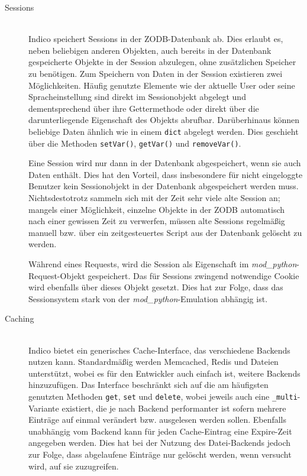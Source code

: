 \begin{description}
\item[Sessions] \hfill \\
Indico speichert Sessions in der ZODB-Datenbank ab. Dies erlaubt es, neben beliebigen anderen
Objekten, auch bereits in der Datenbank gespeicherte Objekte in der Session abzulegen, ohne
zusätzlichen Speicher zu benötigen. Zum Speichern von Daten in der Session existieren zwei
Möglichkeiten. Häufig genutzte Elemente wie der aktuelle User oder seine Spracheinstellung sind
direkt im Sessionobjekt abgelegt und dementsprechend über ihre Gettermethode oder direkt über die
darunterliegende Eigenschaft des Objekts abrufbar. Darüberhinaus können beliebige Daten ähnlich wie
in einem \lstinline{dict} abgelegt werden. Dies geschieht über die Methoden \lstinline{setVar()},
\lstinline{getVar()} und \lstinline{removeVar()}.

Eine Session wird nur dann in der Datenbank abgespeichert, wenn sie auch Daten enthält. Dies hat den
Vorteil, dass insbesondere für nicht eingeloggte Benutzer kein Sessionobjekt in der Datenbank
abgespeichert werden muss. Nichtsdestotrotz sammeln sich mit der Zeit sehr viele alte Session an;
mangels einer Möglichkeit, einzelne Objekte in der ZODB automatisch nach einer gewissen Zeit zu
verwerfen, müssen alte Sessions regelmäßig manuell bzw. über ein zeitgesteuertes Script aus der
Datenbank gelöscht zu werden.

Während eines Requests, wird die Session als Eigenschaft im \emph{mod\_python}-Request-Objekt
gespeichert. Das für Sessions zwingend notwendige Cookie wird ebenfalls über dieses Objekt
gesetzt. Dies hat zur Folge, dass das Sessionsystem stark von der \emph{mod\_python}-Emulation
abhängig ist.


\item[Caching] \hfill \\
Indico bietet ein generisches Cache-Interface, das verschiedene Backends nutzen kann.
Standardmäßig werden Memcached, Redis und Dateien unterstützt, wobei es für den Entwickler auch
einfach ist, weitere Backends hinzuzufügen. Das Interface beschränkt sich auf die am häufigsten
genutzten Methoden \lstinline{get}, \lstinline{set} und \lstinline{delete}, wobei jeweils auch
eine \lstinline{_multi}-Variante existiert, die je nach Backend performanter ist sofern mehrere
Einträge auf einmal verändert bzw. ausgelesen werden sollen. Ebenfalls unabhängig vom Backend kann
für jeden Cache-Eintrag eine Expire-Zeit angegeben werden. Dies hat bei der Nutzung des
Datei-Backends jedoch zur Folge, dass abgelaufene Einträge nur gelöscht werden, wenn versucht wird,
auf sie zuzugreifen.


\end{description}
